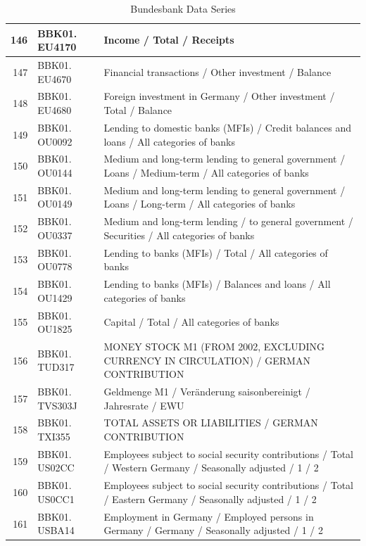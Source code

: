 \documentclass[12pt]{article}
\begin{document}
\begin{table}[ht]
\caption{Bundesbank Data Series}
\label{bb data 2}
\centering
\begin{tabular}{r|p{4cm}p{11cm}}
	\hline
	146 & BBK01. EU4170 & Income / Total / Receipts \\ 
	\hline
	147 & BBK01. EU4670 & Financial transactions / Other investment / Balance \\ 
	\hline
	148 & BBK01. EU4680 & Foreign investment in Germany / Other investment / Total / Balance \\ 
	\hline
	149 & BBK01. OU0092 & Lending to domestic banks (MFIs) / Credit balances and loans / All categories of banks \\ 
	\hline
	150 & BBK01. OU0144 & Medium and long-term lending to general government / Loans / Medium-term / All categories of banks \\ 
	\hline
	151 & BBK01. OU0149 & Medium and long-term lending to general government / Loans / Long-term / All categories of banks \\ 
	\hline
	152 & BBK01. OU0337 & Medium and long-term lending / to general government / Securities / All categories of banks \\ 
	\hline
	153 & BBK01. OU0778 & Lending to banks (MFIs) / Total / All categories of banks \\ 
	\hline
	154 & BBK01. OU1429 & Lending to banks (MFIs) / Balances and loans / All categories of banks \\ 
	\hline
	155 & BBK01. OU1825 & Capital / Total / All categories of banks \\ 
	\hline
	156 & BBK01. TUD317 & MONEY STOCK M1 (FROM 2002, EXCLUDING CURRENCY IN CIRCULATION) / GERMAN CONTRIBUTION 
	\\ 
	\hline
	157 & BBK01. TVS303J & Geldmenge M1 /                                                   Veränderung saisonbereinigt / Jahresrate / EWU \\ 
	\hline
	158 & BBK01. TXI355 & TOTAL ASSETS OR LIABILITIES / GERMAN CONTRIBUTION \\ 
	\hline
	159 & BBK01. US02CC & Employees subject to social security contributions / Total / Western Germany / Seasonally adjusted / 1 / 2 \\ 
	\hline
	160 & BBK01. US0CC1 & Employees subject to social security contributions / Total / Eastern Germany / Seasonally adjusted / 1 / 2 \\ 
	\hline
	161 & BBK01. USBA14 & Employment in Germany / Employed persons in Germany / Germany / Seasonally adjusted / 1 / 2 \\ 

\end{tabular}
\end{table}
\end{document}
